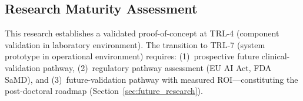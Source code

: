 
\subsection{Research Maturity Assessment}

This research establishes a validated proof-of-concept at TRL-4 (component validation in laboratory environment). The transition to TRL-7 (system prototype in operational environment) requires: (1)~prospective future clinical-validation pathway, (2)~regulatory pathway assessment (EU AI Act, FDA SaMD), and (3)~future-validation pathway with measured ROI---constituting the post-doctoral roadmap (Section~\ref{sec:future_research}).

